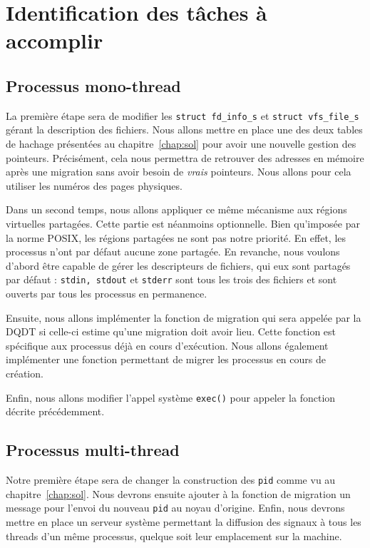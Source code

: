 \chapter{Identification des tâches à accomplir}
\label{chap:tasks}


  \section{Processus mono-thread}

    La première étape sera de modifier les \texttt{struct fd\_info\_s} et
    \texttt{struct vfs\_file\_s} gérant la description des fichiers. Nous allons
    mettre en place une des deux tables de hachage présentées au
    chapitre~\ref{chap:sol} pour avoir une nouvelle gestion des
    pointeurs. Précisément, cela nous permettra de retrouver des adresses en
    mémoire après une migration sans avoir besoin de \textit{vrais}
    pointeurs. Nous allons pour cela utiliser les numéros des pages physiques.

    Dans un second temps, nous allons appliquer ce même mécanisme aux régions
    virtuelles partagées. Cette partie est néanmoins optionnelle. Bien
    qu'imposée par la norme POSIX, les régions partagées ne sont pas notre
    priorité. En effet, les processus n'ont par défaut aucune zone partagée. En
    revanche, nous voulons d'abord être capable de gérer les descripteurs de
    fichiers, qui eux sont partagés par défaut : \texttt{stdin, stdout} et
    \texttt{stderr} sont tous les trois des fichiers et sont ouverts par tous
    les processus en permanence.

    Ensuite, nous allons implémenter la fonction de migration qui sera appelée
    par la DQDT si celle-ci estime qu'une migration doit avoir lieu. Cette
    fonction est spécifique aux processus déjà en cours d'exécution. Nous allons
    également implémenter une fonction permettant de migrer les processus en
    cours de création.
    
    Enfin, nous allons modifier l'appel système \texttt{exec()} pour appeler la
    fonction décrite précédemment.


  \section{Processus multi-thread}

    Notre première étape sera de changer la construction des \texttt{pid} comme
    vu au chapitre~\ref{chap:sol}. Nous devrons ensuite ajouter à la fonction de
    migration un message pour l'envoi du nouveau \texttt{pid} au noyau
    d'origine. Enfin, nous devrons mettre en place un serveur système permettant
    la diffusion des signaux à tous les threads d'un même processus, quelque
    soit leur emplacement sur la machine.

